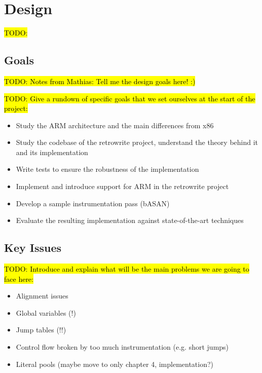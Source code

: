 \documentclass[a4paper,11pt,oneside]{report}
\newcommand{\todo}[1]{%
	\begingroup 
	\sethlcolor{cyan}%
	\hl{TODO: #1}%
	\endgroup
}
\begin{document}
\chapter{Design}

\todo{}

\section{Goals}

\todo{Notes from Mathias: Tell me the design goals here! :)}

\todo{Give a rundown of specific goals that we set ourselves at the start of 
the project:}
\begin{itemize}
	\item Study the ARM architecture and the main differences from x86
	\item Study the codebase of the retrowrite project, understand the theory 
		behind it and its implementation
	\item Write tests to ensure the robustness of the implementation
	\item Implement and introduce support for ARM in the retrowrite project
	\item Develop a sample instrumentation pass (bASAN)
	\item Evaluate the resulting implementation against state-of-the-art 
		techniques
\end{itemize}
	 

\section{Key Issues}
\todo{Introduce and explain what will be the main problems we are going to face 
here:}
\begin{itemize}
	\item Alignment issues
	\item Global variables (!)
	\item Jump tables (!!)
	\item Control flow broken by too much instrumentation (e.g. short jumps)
	\item Literal pools (maybe move to only chapter 4, implementation?)
\end{itemize}
\end{document}
